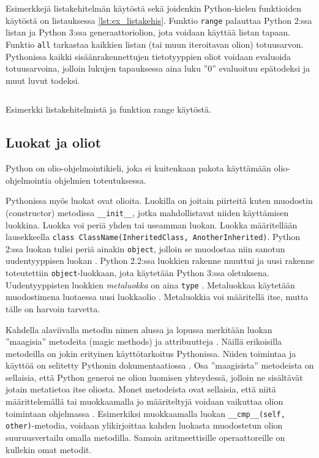 \documentclass[finnish]{tktltiki2}
\theoremstyle{definition}
\theoremstyle{remark}
\begin{document}
Esimerkkejä listakehitelmän käytöstä sekä joidenkin Python-kielen funktioiden käytöstä on listauksessa \ref{lst:ex_listakehis}. Funktio \verb|range| palauttaa Python 2:ssa listan ja Python 3:ssa generaattoriolion, jota voidaan käyttää listan tapaan. Funktio \verb|all| tarkastaa kaikkien listan (tai muun iteroitavan olion) totuusarvon. Pythonissa kaikki sisäänrakennettujen tietotyyppien oliot voidaan evaluoida totuusarvoina, jolloin lukujen tapauksessa aina luku ''0'' evaluoituu epätodeksi ja muut luvut todeksi.

\begin{listing}
    \inputminted[linenos,frame=single,framesep=10pt]{python}{code/luvut.py}
    \caption{Esimerkki listakehitelmistä ja funktion range käytöstä.}
    \label{lst:ex_listakehis}
\end{listing}


\subsection{Luokat ja oliot}

Python on olio-ohjelmointikieli, joka ei kuitenkaan pakota käyttämään olio-ohjelmointia ohjelmien toteutuksessa. 

Pythonissa myös luokat ovat olioita. Luokilla on joitain piirteitä kuten muodostin (constructor) metodissa \verb|__init__|, jotka mahdollistavat niiden käyttämisen luokkina. Luokka voi periä yhden tai useamman luokan. Luokka määritellään lausekkeella \lstinline|class ClassName(InheritedClass, AnotherInherited)|. Python 2:ssa luokan tulisi periä ainakin \verb|object|, jolloin se muodostaa niin sanotun uudentyyppisen luokan \cite[s. 81]{martelli2006python}. Python 2.2:ssa luokkien rakenne muuttui ja uusi rakenne toteutettiin \verb|object|-luokkaan, jota käytetään Python 3:ssa oletuksena. Uudentyyppisten luokkien \emph{metaluokka} on aina \verb|type| \cite[s. 117]{martelli2006python}. Metaluokkaa käytetään muodostimena luotaessa uusi luokkaolio \cite{MetaprogP3}. Metaluokkia voi määritellä itse, mutta tälle on harvoin tarvetta.

Kahdella alaviivalla metodin nimen alussa ja lopussa merkitään luokan ''maagisia'' metodeita (magic methods) ja attribuutteja \cite[s. 104]{martelli2006python}. Näillä erikoisilla metodeilla on jokin erityinen käyttötarkoitus Pythonissa. Niiden toimintaa ja käyttöä on selitetty Pythonin dokumentaatiossa \cite{magic-methods}. Osa ''maagisista'' metodeista on sellaisia, että Python generoi ne olion luomisen yhteydessä, jolloin ne sisältävät jotain metatietoa itse oliosta. Monet metodeista ovat sellaisia, että niitä määrittelemällä tai muokkaamalla jo määriteltyjä voidaan vaikuttaa olion toimintaan ohjelmassa \cite{magic-methods, dive-into-python3}. Esimerkiksi muokkaamalla luokan \verb|__cmp__(self, other)|-metodia, voidaan ylikirjoittaa kahden luokasta muodostetun olion suuruusvertailu omalla metodilla. Samoin aritmeettisille operaattoreille on kullekin omat metodit. 
\end{document}
